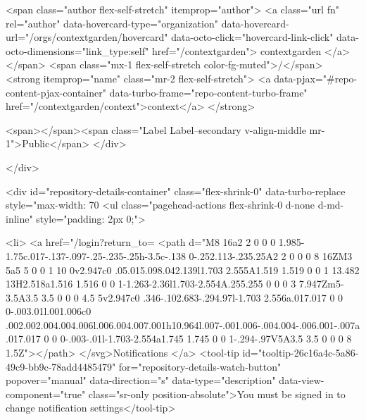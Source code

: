     <span class="author flex-self-stretch" itemprop="author">
      <a class="url fn" rel="author" data-hovercard-type="organization" data-hovercard-url="/orgs/contextgarden/hovercard" data-octo-click="hovercard-link-click" data-octo-dimensions="link_type:self" href="/contextgarden">
        contextgarden
</a>    </span>
    <span class="mx-1 flex-self-stretch color-fg-muted">/</span>
    <strong itemprop="name" class="mr-2 flex-self-stretch">
      <a data-pjax="#repo-content-pjax-container" data-turbo-frame="repo-content-turbo-frame" href="/contextgarden/context">context</a>
    </strong>

    <span></span><span class="Label Label--secondary v-align-middle mr-1">Public</span>
  </div>


        </div>

        <div id="repository-details-container" class="flex-shrink-0" data-turbo-replace style="max-width: 70%
            <ul class="pagehead-actions flex-shrink-0 d-none d-md-inline" style="padding: 2px 0;">
    
      

  <li>
            <a href="/login?return_to=%
    <path d="M8 16a2 2 0 0 0 1.985-1.75c.017-.137-.097-.25-.235-.25h-3.5c-.138 0-.252.113-.235.25A2 2 0 0 0 8 16ZM3 5a5 5 0 0 1 10 0v2.947c0 .05.015.098.042.139l1.703 2.555A1.519 1.519 0 0 1 13.482 13H2.518a1.516 1.516 0 0 1-1.263-2.36l1.703-2.554A.255.255 0 0 0 3 7.947Zm5-3.5A3.5 3.5 0 0 0 4.5 5v2.947c0 .346-.102.683-.294.97l-1.703 2.556a.017.017 0 0 0-.003.01l.001.006c0 .002.002.004.004.006l.006.004.007.001h10.964l.007-.001.006-.004.004-.006.001-.007a.017.017 0 0 0-.003-.01l-1.703-2.554a1.745 1.745 0 0 1-.294-.97V5A3.5 3.5 0 0 0 8 1.5Z"></path>
</svg>Notifications
</a>    <tool-tip id="tooltip-26c16a4c-5a86-49c9-bb9c-78add4485479" for="repository-details-watch-button" popover="manual" data-direction="s" data-type="description" data-view-component="true" class="sr-only position-absolute">You must be signed in to change notification settings</tool-tip>


